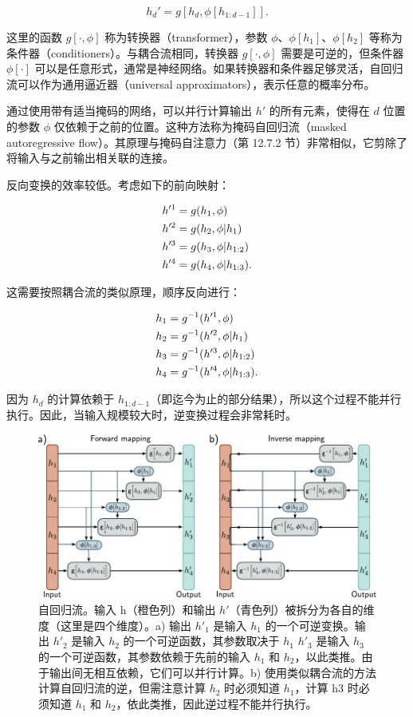 \documentclass[lang=cn,newtx,10pt,scheme=chinese]{elegantbook}
\begin{document}
\begin{equation}
h_d' = g[h_d, \phi[h_{1:d-1}]]. 
\end{equation}

这里的函数 \(g[\cdot, \phi]\) 称为转换器（transformer），参数 \(\phi\)、\(\phi[h_1]\)、\(\phi[h_2]\) 等称为条件器（conditioners）。与耦合流相同，转换器 \(g[\cdot, \phi]\) 需要是可逆的，但条件器 \(\phi[\cdot]\) 可以是任意形式，通常是神经网络。如果转换器和条件器足够灵活，自回归流可以作为通用逼近器（universal approximators），表示任意的概率分布。

通过使用带有适当掩码的网络，可以并行计算输出 \(h'\) 的所有元素，使得在 \(d\) 位置的参数 \(\phi\) 仅依赖于之前的位置。这种方法称为掩码自回归流（masked autoregressive flow）。其原理与掩码自注意力（第 12.7.2 节）非常相似，它剪除了将输入与之前输出相关联的连接。

反向变换的效率较低。考虑如下的前向映射：


\begin{align}
&h'^1 = g(h_1, \phi) \notag \\
&h'^2 = g(h_2, \phi|h_1) \notag \\
&h'^3 = g(h_3, \phi|h_{1:2}) \notag \\
&h'^4 = g(h_4, \phi|h_{1:3}) .  
\end{align}


这需要按照耦合流的类似原理，顺序反向进行：


\begin{align}
&h_1 = g^{-1}(h'^1, \phi) \notag \\
&h_2 = g^{-1}(h'^2, \phi|h_1) \notag \\
&h_3 = g^{-1}(h'^3, \phi|h_{1:2}) \notag \\
&h_4 = g^{-1}(h'^4, \phi|h_{1:3}) . 
\end{align} 


因为 \(h_d\) 的计算依赖于 \(h_{1:d-1}\)（即迄今为止的部分结果），所以这个过程不能并行执行。因此，当输入规模较大时，逆变换过程会非常耗时。

\begin{figure}[ht!]
\centering
\includegraphics[width=0.7\linewidth]{PDFFigures/UDLChap16PDF/FlowAutoregressive.pdf}
\caption{自回归流。输入 h（橙色列）和输出 \(h \prime\)（青色列）被拆分为各自的维度（这里是四个维度）。a) 输出 \(h \prime _1\) 是输入 \(h_1\) 的一个可逆变换。输出 \(h \prime_2\) 是输入 \(h_2\) 的一个可逆函数，其参数取决于 \(h_1\) \(h\prime_3\) 是输入 \(h_3\) 的一个可逆函数，其参数依赖于先前的输入 \(h_1\) 和 \(h_2\)，以此类推。由于输出间无相互依赖，它们可以并行计算。b) 使用类似耦合流的方法计算自回归流的逆，但需注意计算 \(h_2\) 时必须知道 \(h_1\)，计算 h3 时必须知道 \(h_1\) 和 \(h_2\)，依此类推，因此逆过程不能并行执行。}
\end{figure}
\end{document}
